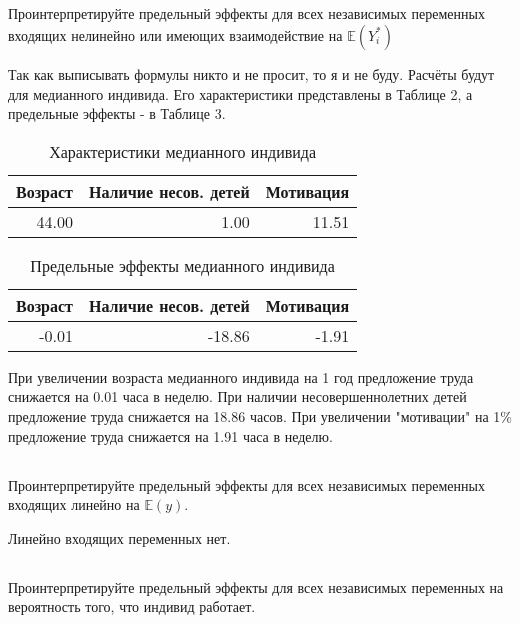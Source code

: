 \documentclass[a4paper,12pt]{article}
\def \mbb{\mathbb}
\def \E{\mbb{E}}
\begin{document}
\subsection{}

\Sun Проинтерпретируйте предельный эффекты для всех независимых переменных
входящих нелинейно или имеющих взаимодействие на $ \E(Y_i^*) $

Так как выписывать формулы никто и не просит, то я и не буду. Расчёты будут для медианного индивида. Его характеристики представлены в Таблице 2, а предельные эффекты - в Таблице 3.

\begin{table}[ht]
	\centering
	\begin{tabular}{|rrr|}
		\hline
		Возраст & Наличие несов. детей & Мотивация \\ 
		\hline
		 44.00 & 1.00 & 11.51 \\ 
		\hline
	\end{tabular}
\caption{{Характеристики медианного индивида}}
\end{table}

\begin{table}[ht]
	\centering
	\begin{tabular}{|rrr|}
		\hline
		Возраст & Наличие несов. детей & Мотивация \\ 
		\hline
		 -0.01 & -18.86 & -1.91 \\ 
		\hline
	\end{tabular}
\caption{Предельные эффекты медианного индивида}
\end{table}

При увеличении возраста медианного индивида на 1 год предложение труда снижается на 0.01 часа в неделю. При наличии несовершеннолетних детей предложение труда снижается на 18.86 часов. При увеличении "мотивации" на 1\% предложение труда снижается на 1.91 часа в неделю. 

\subsection{}
\Sun Проинтерпретируйте предельный эффекты для всех независимых переменных
входящих линейно на
 $ \E(y) $.
 
Линейно входящих переменных нет.


\subsection{}

\Sun Проинтерпретируйте предельный эффекты для всех независимых переменных
на вероятность того, что индивид работает.
\end{document}
